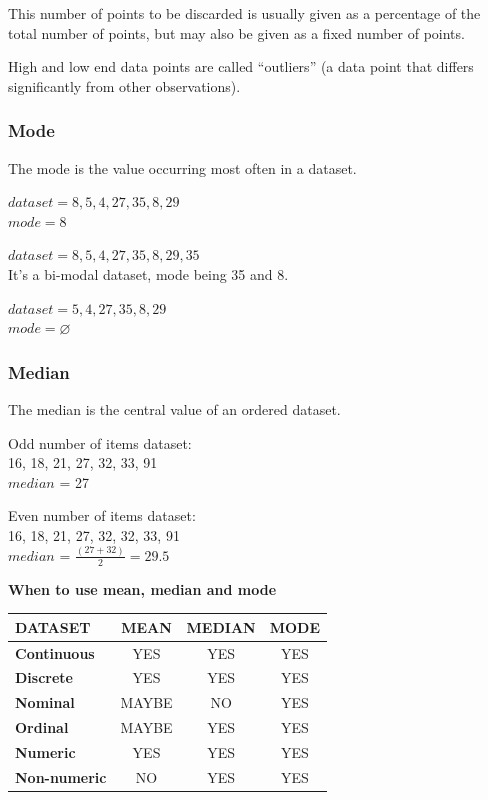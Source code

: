 \documentclass{article}
\begin{document}
This number of points to be discarded is usually given as a percentage of the total number of points, but may also be given as a fixed number of points.

High and low end data points are called “outliers” (a data point that differs significantly from other observations).

\subsubsection{Mode}
The mode is the value occurring most often in a dataset.

$dataset = 8, 5, 4, 27, 35, 8, 29$ \\ 
$mode = 8$

$dataset = 8, 5, 4, 27, 35, 8, 29, 35$ \\ 
It’s a bi-modal dataset, mode being 35 and 8.

$dataset =  5, 4, 27, 35, 8, 29$ \\ 
$mode = \varnothing $

\subsubsection{Median}
The median is the central value of an ordered dataset.

Odd number of items dataset: \\
16, 18, 21, 27, 32, 33, 91 \\
$median$ = 27

Even number of items dataset: \\
16, 18, 21, 27, 32, 32, 33, 91 \\
$median$ = $\frac{(27 + 32)}{2} = 29.5$ 

\textbf{When to use mean, median and mode}

\begin{center}
\begin{tabular}{|l|c|c|c|}
\hline
DATASET & MEAN & MEDIAN & MODE \\ \hline
\textbf{Continuous} & YES & YES & YES \\ 
\textbf{Discrete} & YES & YES & YES \\ 
\textbf{Nominal} & MAYBE & NO & YES \\
\textbf{Ordinal} & MAYBE & YES & YES \\
\textbf{Numeric} & YES & YES & YES \\
\textbf{Non-numeric} & NO & YES & YES \\ 
\hline
\end{tabular}
\end{center}
\end{document}
